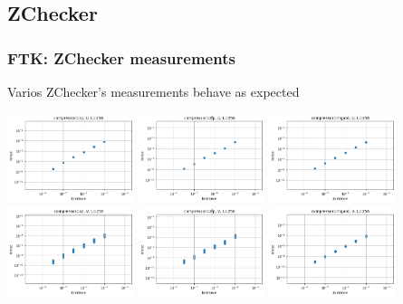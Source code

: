 \subsection{ZChecker}
\begin{frame}[fragile]
  \frametitle{FTK: ZChecker measurements}

  Varios ZChecker's measurements behave as expected

  \begin{center}
    \includegraphics[width=3.7cm]{graphs/rmse_sz_U.png}
    \includegraphics[width=3.7cm]{graphs/rmse_zfp_U.png}
    \includegraphics[width=3.7cm]{graphs/rmse_mgard_U.png}
    \includegraphics[width=3.7cm]{graphs/rmse_sz_V.png}
    \includegraphics[width=3.7cm]{graphs/rmse_zfp_V.png}
    \includegraphics[width=3.7cm]{graphs/rmse_mgard_V.png}        
  \end{center}

\end{frame}

